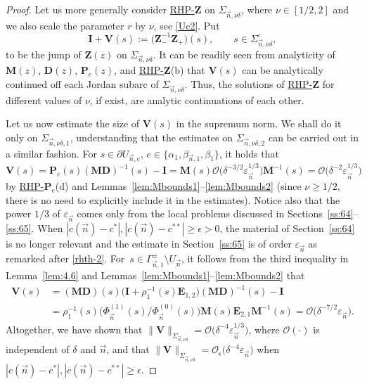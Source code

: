 \documentclass[pdftex]{sigma}
\numberwithin{equation}{section}
\newcommand{\n}{{\vec n}}
\newcommand{\rhp} {\textnormal{RHP}-${\boldsymbol P}$}
\newcommand{\rhz} {\textnormal{RHP}-${\boldsymbol Z}$}
\begin{document}
\begin{proof}
Let us more generally consider \hyperref[rhz]{\rhz} on $ \Sigma_{\n,\nu\delta} $, where $ \nu\in[1/2,2] $ and we also scale the parameter $ r $ by $ \nu $, see \eqref{Uc2}. Put
\[
\boldsymbol I + \boldsymbol V(s) := \bigl(\boldsymbol Z_-^{-1}\boldsymbol Z_+\bigr)(s), \qquad s\in \Sigma_{\n,\nu\delta}^\circ,
\]
to be the jump of $ \boldsymbol Z(z) $ on $ \Sigma_{\n,\nu\delta} $. It can be readily seen from analyticity of $ \boldsymbol M(z) $, $ \boldsymbol D(z) $, $ \boldsymbol P_e(z) $, and \hyperref[rhz]{\rhz}(b) that $ \boldsymbol V(s) $ can be analytically continued off each Jordan subarc of $ \Sigma_{\n,\nu\delta} $. Thus, the solutions of \hyperref[rhz]{\rhz} for different values of $ \nu $, if exist, are analytic continuations of each other.

Let us now estimate the size of $ \boldsymbol V(s) $ in the supremum norm. We shall do it only on $ \Sigma_{\n,\nu\delta,1} $, understanding that the estimates on $ \Sigma_{\n,\nu\delta,2} $ can be carried out in a similar fashion. For $ s\in\partial U_{\n,e} $, $ e\in \{\alpha_1,\beta_{\n,1},\beta_1\} $, it holds that
\[
\boldsymbol V(s) = \boldsymbol P_e(s) (\boldsymbol{MD})^{-1}(s) - \boldsymbol I = \boldsymbol M(s) \boldsymbol{\mathcal O} \bigl( \delta^{-3/2} \varepsilon_\n^{1/3} \bigr) \boldsymbol M^{-1}(s) = \boldsymbol{\mathcal O}\bigl( \delta^{-2} \varepsilon_\n^{1/3}\bigr)
\]
by \hyperref[rhp]{\rhp$_e$}(d) and Lemmas~\ref{lem:Mbounds1}--\ref{lem:Mbounds2} (since $ \nu\geq1/2 $, there is no need to explicitly include it in the estimates). Notice also that the power $ 1/3 $ of $ \varepsilon_\n $ comes only from the local problems discussed in Sections~\ref{ss:64}--\ref{ss:65}. When $ |c(\n)-c^\ast|,|c(\n)-c^{\ast\ast}|\geq\epsilon>0 $, the material of Section~\ref{ss:64} is no longer relevant and the estimate in Section~\ref{ss:65} is of order $ \varepsilon_\n $ as remarked after \eqref{rhth-2}. For~$ s\in \Gamma_{\n,1}^\pm\setminus U_\n $, it follows from the third inequality in Lemma~\ref{lem:4.6} and Lemmas~\ref{lem:Mbounds1}--\ref{lem:Mbounds2} that
\begin{align*}
\boldsymbol V(s) &= (\boldsymbol {MD})(s) \bigl(\boldsymbol I+\rho_1^{-1}(s)\boldsymbol E_{1,2}\bigr) (\boldsymbol{MD})^{-1}(s) - \boldsymbol I \\
& = \rho_1^{-1}(s) \bigl( \Phi_\n^{(1)}(s)/\Phi_\n^{(0)}(s) \bigr) \boldsymbol M(s)\boldsymbol E_{2,1}\boldsymbol M^{-1}(s) = \boldsymbol{\mathcal O}\bigl( \delta^{-7/2}\varepsilon_\n \bigr).
\end{align*}
Altogether, we have shown that $ \|\boldsymbol V\|_{\Sigma_{\n,\nu\delta}} = \mathcal O\bigl( \delta^{-4}\varepsilon_\n ^{1/3} \bigr) $, where $ \mathcal O(\cdot) $ is independent of $ \delta $ and $ \n $, and that $ \|\boldsymbol V\|_{\Sigma_{\n,\nu\delta}} = \mathcal O_\epsilon\bigl( \delta^{-4}\varepsilon_\n \bigr) $ when $ |c(\n)-c^\ast|,|c(\n)-c^{\ast\ast}|\geq\epsilon $.


\end{proof}
\end{document}
